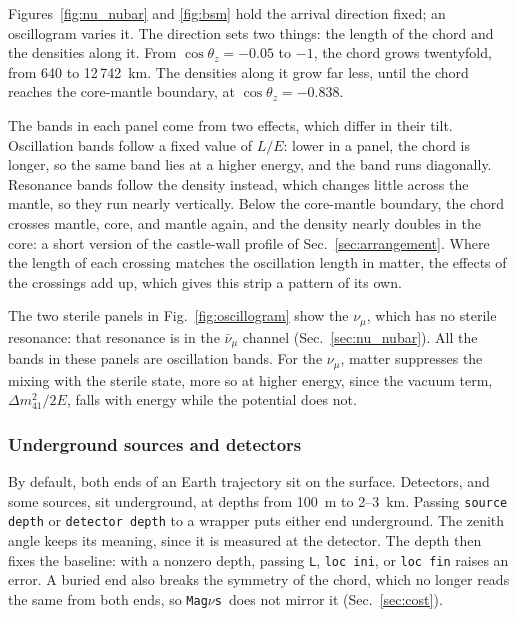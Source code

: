 \documentclass[final,5p,times,twocolumn,sort,compress]{elsarticle}
\makeatletter
\newcommand{\fig}{Fig.}
\DeclareRobustCommand{\_}{%
  \ifmmode\nfss@text{\textunderscore}\else\textunderscore\allowbreak\fi}
\newcommand{\figu}[1]{\fig~\ref{fig:#1}}
\newcommand{\magnus}{{\tt Mag}\ensuremath{\nu}{\tt s}}
\makeatother
\begin{document}
Figures~\ref{fig:nu_nubar} and \ref{fig:bsm} hold the arrival direction fixed; an oscillogram varies it. The direction sets two things: the length of the chord and the densities along it. From $\cos\theta_z = -0.05$ to $-1$, the chord grows twentyfold, from 640 to 12\,742~km. The densities along it grow far less, until the chord reaches the core-mantle boundary, at $\cos\theta_z = -0.838$.

The bands in each panel come from two effects, which differ in their tilt. Oscillation bands follow a fixed value of $L/E$: lower in a panel, the chord is longer, so the same band lies at a higher energy, and the band runs diagonally. Resonance bands follow the density instead, which changes little across the mantle, so they run nearly vertically. Below the core-mantle boundary, the chord crosses mantle, core, and mantle again, and the density nearly doubles in the core: a short version of the castle-wall profile of Sec.~\ref{sec:arrangement}. Where the length of each crossing matches the oscillation length in matter, the effects of the crossings add up, which gives this strip a pattern of its own.

The two sterile panels in \figu{oscillogram} show the $\nu_\mu$, which has no sterile resonance: that resonance is in the $\bar{\nu}_\mu$ channel (Sec.~\ref{sec:nu_nubar}). All the bands in these panels are oscillation bands. For the $\nu_\mu$, matter suppresses the mixing with the sterile state, more so at higher energy, since the vacuum term, $\Delta m^2_{41}/2E$, falls with energy while the potential does not. 


\subsubsection{Underground sources and detectors}
\label{sec:underground}

By default, both ends of an Earth trajectory sit on the surface. Detectors, and some sources, sit underground, at depths from 100~m to 2--3~km. Passing {\tt source\_depth} or {\tt detector\_depth} to a wrapper puts either end underground. The zenith angle keeps its meaning, since it is measured at the detector. The depth then fixes the baseline: with a nonzero depth, passing {\tt L}, {\tt loc\_ini}, or {\tt loc\_fin} raises an error. A buried end also breaks the symmetry of the chord, which no longer reads the same from both ends, so \magnus\ does not mirror it (Sec.~\ref{sec:cost}).
\end{document}

